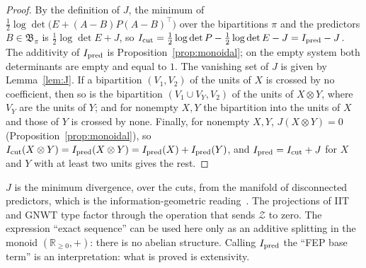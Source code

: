 \begin{proof}
By the definition of $J$, the minimum of $\tfrac12\log\det\bigl(E+(A-B)P(A-B)^\top\bigr)$ over the bipartitions $\pi$ and the predictors $B\in\mathfrak B_\pi$ is $\tfrac12\log\det E+J$, so $I_{\rm cut}=\tfrac12\log\det P-\tfrac12\log\det E-J=I_{\rm pred}-J$. The additivity of $I_{\rm pred}$ is Proposition~\ref{prop:monoidal}; on the empty system both determinants are empty and equal to $1$. The vanishing set of $J$ is given by Lemma~\ref{lem:J}. If a bipartition $(V_1,V_2)$ of the units of $X$ is crossed by no coefficient, then so is the bipartition $(V_1\cup V_Y,V_2)$ of the units of $X\otimes Y$, where $V_Y$ are the units of $Y$; and for nonempty $X,Y$ the bipartition into the units of $X$ and those of $Y$ is crossed by none. Finally, for nonempty $X,Y$, $J(X\otimes Y)=0$ (Proposition~\ref{prop:monoidal}), so $I_{\rm cut}(X\otimes Y)=I_{\rm pred}(X\otimes Y)=I_{\rm pred}(X)+I_{\rm pred}(Y)$, and $I_{\rm pred}=I_{\rm cut}+J$ for $X$ and $Y$ with at least two units gives the rest.
\end{proof}
$J$ is the minimum divergence, over the cuts, from the manifold of disconnected predictors, which is the information-geometric reading~\cite{Oizumi2016PNAS}. The projections of IIT and GNWT type factor through the operation that sends $\mathcal Z$ to zero. The expression ``exact sequence'' can be used here only as an additive splitting in the monoid $(\mathbb R_{\ge0},+)$: there is no abelian structure. Calling $I_{\rm pred}$ the ``FEP base term'' is an interpretation: what is proved is extensivity.

